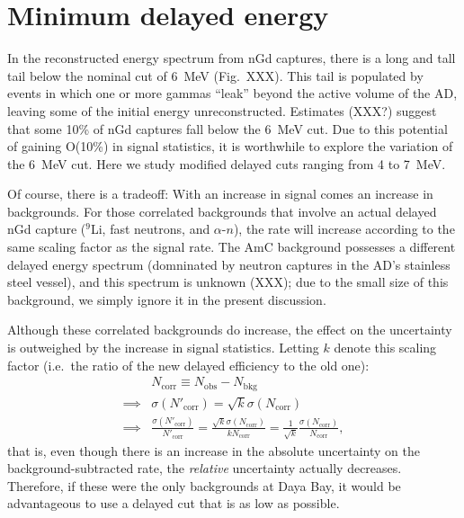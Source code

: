 \documentclass[../thesis.tex]{subfiles}
\begin{document}
\section{Minimum delayed energy}
\label{sec:cutVaryMinDelayed}

In the reconstructed energy spectrum from nGd captures, there is a long and tall tail below the nominal cut of 6~MeV (Fig.~XXX). This tail is populated by events in which one or more gammas ``leak'' beyond the active volume of the AD, leaving some of the initial energy unreconstructed. Estimates (XXX?) suggest that some 10\% of nGd captures fall below the 6~MeV cut. Due to this potential of gaining O(10\%) in signal statistics, it is worthwhile to explore the variation of the 6~MeV cut. Here we study modified delayed cuts ranging from 4 to 7~MeV.

Of course, there is a tradeoff: With an increase in signal comes an increase in backgrounds. For those correlated backgrounds that involve an actual delayed nGd capture ($^9$Li, fast neutrons, and $\alpha$-$n$), the rate will increase according to the same scaling factor as the signal rate. The AmC background possesses a different delayed energy spectrum (domninated by neutron captures in the AD's stainless steel vessel), and this spectrum is unknown (XXX); due to the small size of this background, we simply ignore it in the present discussion.

Although these correlated backgrounds do increase, the effect on the uncertainty is outweighed by the increase in signal statistics. Letting $k$ denote this scaling factor (i.e.\ the ratio of the new delayed efficiency to the old one):
\begin{align}
  \label{eq:cutVaryDelayedNcorrSigma}
  & N_{\mathrm{corr}} \equiv N_{\mathrm{obs}} - N_{\mathrm{bkg}} \\
  \implies & \sigma(N'_{\mathrm{corr}}) = \sqrt{k} \sigma(N_{\mathrm{corr}}) \\
  \implies & \frac{\sigma(N'_{\mathrm{corr}})}{N'_{\mathrm{corr}}} = \frac{\sqrt{k} \sigma(N_{\mathrm{corr}})}{k N_{\mathrm{corr}}} = \frac{1}{\sqrt{k}} \frac{\sigma(N_{\mathrm{corr}})}{N_{\mathrm{corr}}},
\end{align}
that is, even though there is an increase in the absolute uncertainty on the background-subtracted rate, the \emph{relative} uncertainty actually decreases. Therefore, if these were the only backgrounds at Daya Bay, it would be advantageous to use a delayed cut that is as low as possible.
\end{document}
